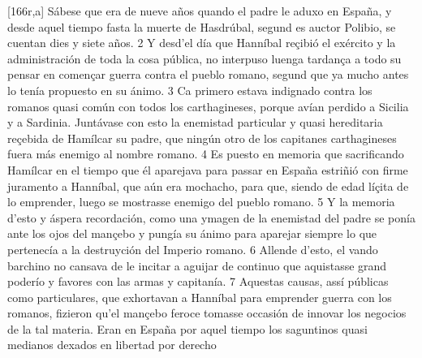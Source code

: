 \documentclass[11pt,twoside]{article}\makeatletter
\def\persName{}\def\name{}
\def\placeName{}
\begin{document}
[166r,a] Sábese que era de nueve años quando el padre le aduxo en  {\placeName España}, y desde aquel tiempo fasta la muerte de  {\persName Hasdrúbal}, segund es auctor  {\persName Polibio}, se cuentan dies y siete años. 2 Y desd'el día que  {\persName Hanníbal} reçibió el exército y la administración de toda la cosa pública, no interpuso luenga tardança a todo su pensar en començar guerra contra el pueblo romano, segund que ya mucho antes lo tenía propuesto en su ánimo. 3 Ca primero estava indignado contra los romanos quasi común con todos los  {\name carthagineses}, porque avían perdido a  {\placeName Sicilia} y a  {\placeName Sardinia}. Juntávase con esto la enemistad particular y quasi hereditaria reçebida de  {\persName Hamílcar} su padre, que ningún otro de los capitanes  {\name carthagineses} fuera más enemigo al nombre romano. 4 Es puesto en memoria que sacrificando  {\persName Hamílcar} en el tiempo que él aparejava para passar en  {\placeName España} estriñió con firme juramento a  {\persName Hanníbal}, que aún era mochacho, para que, siendo de edad líçita de lo emprender, luego se mostrasse enemigo del pueblo romano. 5 Y la memoria d'esto y áspera recordación, como una ymagen de la enemistad del padre se ponía ante los ojos del mançebo y pungía su ánimo para aparejar siempre lo que pertenecía a la destruyción del Imperio romano. 6 Allende d'esto, el vando barchino no cansava de le incitar a aguijar de continuo que aquistasse grand poderío y favores con las armas y capitanía. 7 Aquestas causas, assí públicas como particulares, que exhortavan a  {\persName Hanníbal} para emprender guerra con los romanos, fizieron qu'el mançebo feroce tomasse occasión de innovar los negocios de la tal materia.
\pend
{} Eran en  {\placeName España} por aquel tiempo los  {\name saguntinos} quasi medianos dexados en libertad por derecho %
\end{document}
